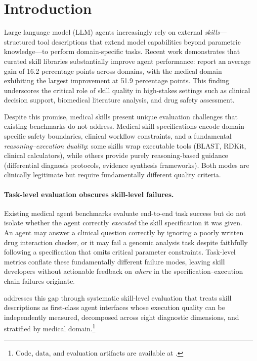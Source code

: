 \section{Introduction}
\label{sec:intro}

Large language model (LLM) agents increasingly rely on external \emph{skills}---structured tool descriptions that extend model capabilities beyond parametric knowledge---to perform domain-specific tasks.
Recent work demonstrates that curated skill libraries substantially improve agent performance: \citet{skillsbench2026} report an average gain of 16.2 percentage points across domains, with the medical domain exhibiting the largest improvement at 51.9 percentage points.
This finding underscores the critical role of skill quality in high-stakes settings such as clinical decision support, biomedical literature analysis, and drug safety assessment.

Despite this promise, medical skills present unique evaluation challenges that existing benchmarks do not address.
Medical skill specifications encode domain-specific safety boundaries, clinical workflow constraints, and a fundamental \emph{reasoning--execution duality}: some skills wrap executable tools (BLAST, RDKit, clinical calculators), while others provide purely reasoning-based guidance (differential diagnosis protocols, evidence synthesis frameworks).
Both modes are clinically legitimate but require fundamentally different quality criteria.

\paragraph{Task-level evaluation obscures skill-level failures.}
Existing medical agent benchmarks evaluate end-to-end task success \citep{healthbench2025, medagentbench2025, labbench2024} but do not isolate whether the agent correctly \emph{executed} the skill specification it was given.
An agent may answer a clinical question correctly by ignoring a poorly written drug interaction checker, or it may fail a genomic analysis task despite faithfully following a specification that omits critical parameter constraints.
Task-level metrics conflate these fundamentally different failure modes, leaving skill developers without actionable feedback on \emph{where} in the specification--execution chain failures originate.

\medskillbench addresses this gap through systematic skill-level evaluation that treats skill descriptions as first-class agent interfaces whose execution quality can be independently measured, decomposed across eight diagnostic dimensions, and stratified by medical domain.\footnote{Code, data, and evaluation artifacts are available at \anonrepo.}

